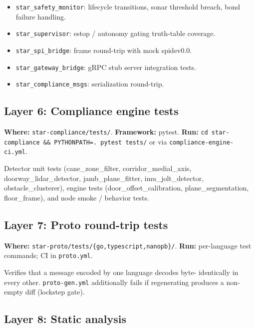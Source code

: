 \begin{itemize}
  \item \texttt{star\_safety\_monitor}: lifecycle transitions, sonar
        threshold breach, bond failure handling.
  \item \texttt{star\_supervisor}: estop / autonomy gating
        truth-table coverage.
  \item \texttt{star\_spi\_bridge}: frame round-trip with mock
        spidev0.0.
  \item \texttt{star\_gateway\_bridge}: gRPC stub server integration
        tests.
  \item \texttt{star\_compliance\_msgs}: serialization round-trip.
\end{itemize}

\subsection{Layer 6: Compliance engine tests}

\textbf{Where:} \texttt{star-compliance/tests/}.
\textbf{Framework:} pytest.
\textbf{Run:} \texttt{cd star-compliance \&\& PYTHONPATH=. pytest tests/}
or via \texttt{compliance-engine-ci.yml}.

Detector unit tests (cane\_zone\_filter, corridor\_medial\_axis,
doorway\_lidar\_detector, jamb\_plane\_fitter, imu\_jolt\_detector,
obstacle\_clusterer), engine tests (door\_offset\_calibration,
plane\_segmentation, floor\_frame), and node smoke / behavior tests.

\subsection{Layer 7: Proto round-trip tests}

\textbf{Where:} \texttt{star-proto/tests/\{go,typescript,nanopb\}/}.
\textbf{Run:} per-language test commands; CI in \texttt{proto.yml}.

Verifies that a message encoded by one language decodes byte-
identically in every other. \texttt{proto-gen.yml} additionally
fails if regenerating produces a non-empty diff (lockstep gate).

\subsection{Layer 8: Static analysis}

